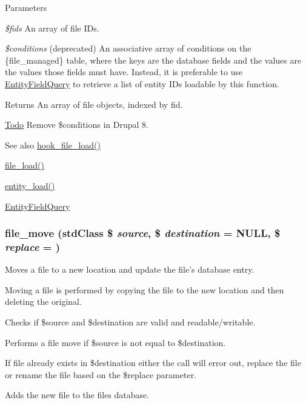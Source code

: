 \begin{DoxyParams}{Parameters}
\item[{\em \$fids}]An array of file IDs. \item[{\em \$conditions}](deprecated) An associative array of conditions on the \{file\_\-managed\} table, where the keys are the database fields and the values are the values those fields must have. Instead, it is preferable to use \hyperlink{classEntityFieldQuery}{EntityFieldQuery} to retrieve a list of entity IDs loadable by this function.\end{DoxyParams}
\begin{DoxyReturn}{Returns}
An array of file objects, indexed by fid.
\end{DoxyReturn}
\begin{Desc}
\item[\hyperlink{todo__todo000004}{Todo}]Remove \$conditions in Drupal 8.\end{Desc}
\begin{DoxySeeAlso}{See also}
\hyperlink{group__hooks_ga9f6bf6919600b83a565421f6a7faf678}{hook\_\-file\_\-load()} 

\hyperlink{group__file_ga138bd2e393c743b41a642003eecbf98f}{file\_\-load()} 

\hyperlink{common_8inc_a78b89cf93f9710a68d02f86adccf1898}{entity\_\-load()} 

\hyperlink{classEntityFieldQuery}{EntityFieldQuery} 
\end{DoxySeeAlso}
\hypertarget{group__file_gad6f4eec44e0c32bf0cde6c602d5da38f}{
\subsubsection[{file\_\-move}]{\setlength{\rightskip}{0pt plus 5cm}file\_\-move (stdClass \$ {\em source}, \/  \$ {\em destination} = {\ttfamily NULL}, \/  \$ {\em replace} = {})}}
\label{group__file_gad6f4eec44e0c32bf0cde6c602d5da38f}
Moves a file to a new location and update the file's database entry.

Moving a file is performed by copying the file to the new location and then deleting the original.
\begin{DoxyItemize}
\item Checks if \$source and \$destination are valid and readable/writable.
\item Performs a file move if \$source is not equal to \$destination.
\item If file already exists in \$destination either the call will error out, replace the file or rename the file based on the \$replace parameter.
\item Adds the new file to the files database.
\end{DoxyItemize}



